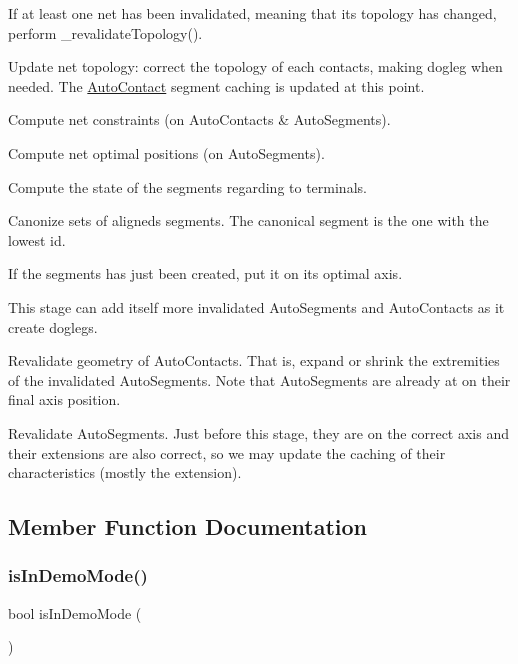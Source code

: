 \begin{DoxyItemize}
\item If at least one net has been invalidated, meaning that it\textquotesingle{}s topology has changed, perform {\ttfamily \+\_\+revalidate\+Topology()}. 
\begin{DoxyItemize}
\item Update net topology\+: correct the topology of each contacts, making dogleg when needed. The \hyperlink{classKatabatic_1_1AutoContact}{Auto\+Contact} segment caching is updated at this point. 
\item Compute net constraints (on Auto\+Contacts \& Auto\+Segments). 
\item Compute net optimal positions (on Auto\+Segments). 
\item Compute the state of the segments regarding to terminals. 
\item Canonize sets of aligneds segments. The canonical segment is the one with the lowest {\ttfamily id}. 
\item If the segments has just been created, put it on its optimal axis. 
\end{DoxyItemize}This stage can add itself more invalidated Auto\+Segments and Auto\+Contacts as it create doglegs.


\item Revalidate geometry of Auto\+Contacts. That is, expand or shrink the extremities of the invalidated Auto\+Segments. Note that Auto\+Segments are already at on their final axis position.


\item Revalidate Auto\+Segments. Just before this stage, they are on the correct axis and their extensions are also correct, so we may update the caching of their characteristics (mostly the extension). 
\end{DoxyItemize}

\subsection{Member Function Documentation}
\mbox{\label{classKatabatic_1_1Session_a037c7ec3b18ec43973f2e6fe3a172000}} 
\subsubsection{\texorpdfstring{is\+In\+Demo\+Mode()}{isInDemoMode()}}
{\footnotesize\ttfamily bool is\+In\+Demo\+Mode (\begin{DoxyParamCaption}{ }\end{DoxyParamCaption})\hspace{0.3cm}{\ttfamily [static]}}


